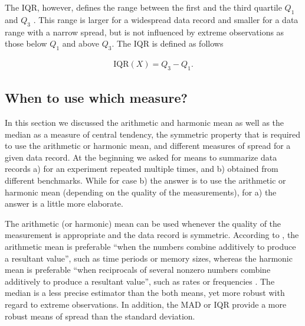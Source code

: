 The IQR, however, defines the range between the first and the third quartile
$Q_1$ and $Q_3$ \citep{shanmugam_statistics_2015}. This range is larger for a
widespread data record and smaller for a data range with a narrow spread, but is not influenced by extreme
observations as those below $Q_1$ and above $Q_3$. The IQR is defined as follows

\begin{equation} \label{eq:iqr}
\begin{split}
\mathrm{IQR}(X) = Q_3 - Q_1.
\end{split}
\end{equation}

\subsection{When to use which measure?}
In this section we discussed the arithmetic and harmonic mean as well as the
median as a measure of central tendency, the symmetric property that is
required to use the arithmetic or harmonic mean, and different measures of
spread for a given data record. At the beginning we asked for means to
summarize data records a) for an experiment repeated multiple times, and b)
obtained from different benchmarks. While for case b) the answer is to use the
arithmetic or harmonic mean (depending on the quality of the measurements), for
a) the answer is a little more elaborate.

The arithmetic (or harmonic) mean can be used whenever the quality of the
measurement is appropriate and the data record is symmetric. According to
\cite{shanmugam_statistics_2015}, the arithmetic mean is preferable ``when the numbers combine
additively to produce a resultant value'', such as time periods or memory sizes, whereas
the harmonic mean is preferable ``when reciprocals of several nonzero numbers
combine additively to produce a resultant value'', such as rates or frequencies
\citep{smith_characterizing_1988}.
The median is a less precise estimator than the both means, yet more robust
with regard to extreme observations. In addition, the MAD or IQR provide a more
robust means of spread than the standard deviation.


